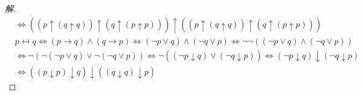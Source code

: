 \documentclass{article}
\begin{document}
\begin{CJK*}{UTF8}{gbsn}
\begin{proof}[解]
\begin{align*}
      &\Leftrightarrow((p\uparrow  (q\uparrow q))\uparrow (q\uparrow (p\uparrow p)))\uparrow ((p\uparrow  (q\uparrow q))\uparrow (q\uparrow (p\uparrow p)))\\
      &p\leftrightarrow q\Leftrightarrow (p\to q)\land (q\to p)\Leftrightarrow (\lnot p \lor q) \land (\lnot q\lor p) \Leftrightarrow\lnot \lnot ((\lnot p \lor q) \land (\lnot q\lor p))\\
      &\Leftrightarrow \lnot (\lnot (\lnot p \lor q) \lor \lnot (\lnot q\lor p)) \Leftrightarrow \lnot ((\lnot p \downarrow q) \lor (\lnot q\downarrow p)) \Leftrightarrow (\lnot p \downarrow q) \downarrow (\lnot q\downarrow p) \\
      &\Leftrightarrow( (p\downarrow p) \downarrow q) \downarrow ((q\downarrow q)\downarrow p)
    \end{align*}
  \end{proof}
\end{CJK*}
\end{document}
